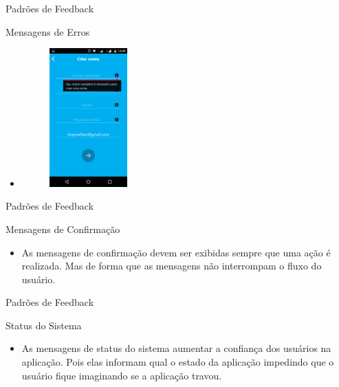 \begin{frame}{Padrões de Feedback}
\begin{block}{Mensagens de Erros}
  \begin{itemize}
    \item<1-> \begin{figure}
    \includegraphics[width=3cm]{figuras/error/error5}
    \end{figure}
  \end{itemize}
\end{block}
\end{frame}

\begin{frame}{Padrões de Feedback}
\begin{block}{Mensagens de Confirmação}
  \begin{itemize}
    \item<1-> As mensagens de confirmação devem ser exibidas sempre que uma ação é realizada. Mas de forma que as mensagens não interrompam o fluxo do usuário.
  \end{itemize}
\end{block}
\end{frame}

\begin{frame}{Padrões de Feedback}
\begin{block}{Status do Sistema}
  \begin{itemize}
    \item<1-> As mensagens de status do sistema aumentar a confiança dos usuários na aplicação. Pois elas informam qual o estado da aplicação impedindo que o usuário fique imaginando se a aplicação travou.
  \end{itemize}
\end{block}
\end{frame}
